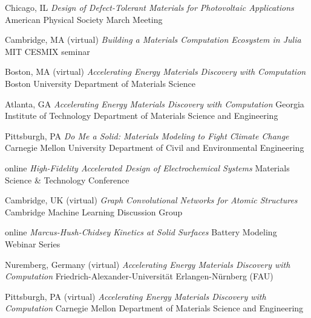 \vspace{\talksep}
\datedsubsection{}
    {Chicago, IL}
    {\textit{Design of Defect-Tolerant Materials for Photovoltaic Applications}}
    {American Physical Society March Meeting}

\vspace{\talksep}
\datedsubsection{}
    {Cambridge, MA (virtual)}
    {\textit{Building a Materials Computation Ecosystem in Julia}}
    {MIT CESMIX seminar}

\vspace{\talksep}
\datedsubsection{}
    {Boston, MA (virtual)}
    {\textit{Accelerating Energy Materials Discovery with Computation}}
    {Boston University Department of Materials Science}

\vspace{\talkyearsep}
    {Atlanta, GA}
    {\textit{Accelerating Energy Materials Discovery with Computation}}
    {Georgia Institute of Technology Department of Materials Science and Engineering}

\vspace{\talksep}
\datedsubsection{}
    {Pittsburgh, PA}
    {\textit{Do Me a Solid: Materials Modeling to Fight Climate Change}}
    {Carnegie Mellon University Department of Civil and Environmental Engineering}

\vspace{\talkyearsep}
    {online}
    {\textit{High-Fidelity Accelerated Design of Electrochemical Systems}}
    {Materials Science \& Technology Conference}

\vspace{\talksep}
\datedsubsection{}
    {Cambridge, UK (virtual)}
    {\textit{Graph Convolutional Networks for Atomic Structures}}
    {Cambridge Machine Learning Discussion Group}

\vspace{\talksep}
\datedsubsection{}
    {online}
    {\textit{Marcus-Hush-Chidsey Kinetics at Solid Surfaces}}
    {Battery Modeling Webinar Series}

\vspace{\talksep}
\datedsubsection{}
    {Nuremberg, Germany (virtual)}
    {\textit{Accelerating Energy Materials Discovery with Computation}}
    {Friedrich-Alexander-Universit\"at Erlangen-N\"urnberg (FAU)}

\vspace{\talksep}
\datedsubsection{}
    {Pittsburgh, PA (virtual)}
    {\textit{Accelerating Energy Materials Discovery with Computation}}
    {Carnegie Mellon Department of Materials Science and Engineering}


